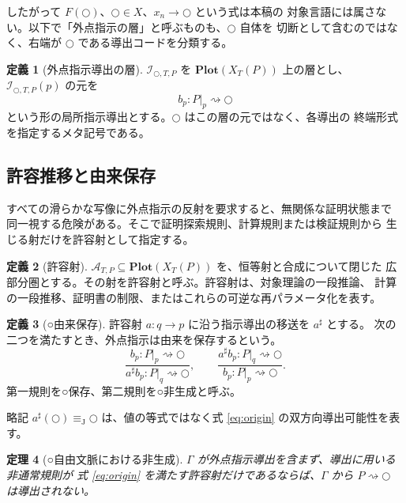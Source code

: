 \documentclass[a4paper,11pt]{ltjsarticle}
\theoremstyle{definition}
\newtheorem{definition}{定義}[section]
\theoremstyle{plain}
\newtheorem{theorem}[definition]{定理}
\newcommand{\dfix}{\mathord{\text{○}}}
\newcommand{\Plot}{\mathbf{Plot}}
\newcommand{\JTeq}{\equiv_{\mathrm J}}
\newcommand{\1}{\mathbf{1}}
\begin{document}
したがって $F(\dfix)$、$\dfix\in X$、$x_n\to\dfix$ という式は本稿の
対象言語には属さない。以下で「外点指示の層」と呼ぶものも、$\dfix$ 自体を
切断として含むのではなく、右端が $\dfix$ である導出コードを分類する。

\begin{definition}[外点指示導出の層]
$\mathcal I_{\dfix,T,P}$ を $\Plot(X_T(P))$ 上の層とし、
$\mathcal I_{\dfix,T,P}(p)$ の元を
\[
 b_p:P|_p\rightsquigarrow\dfix
\]
という形の局所指示導出とする。$\dfix$ はこの層の元ではなく、各導出の
終端形式を指定するメタ記号である。
\end{definition}

\subsection{許容推移と由来保存}

すべての滑らかな写像に外点指示の反射を要求すると、無関係な証明状態まで
同一視する危険がある。そこで証明探索規則、計算規則または検証規則から
生じる射だけを許容射として指定する。

\begin{definition}[許容射]
$\mathcal A_{T,P}\subseteq\Plot(X_T(P))$ を、恒等射と合成について閉じた
広部分圏とする。その射を許容射と呼ぶ。許容射は、対象理論の一段推論、
計算の一段推移、証明書の制限、またはこれらの可逆な再パラメータ化を表す。
\end{definition}

\begin{definition}[○由来保存]
許容射 $a:q\to p$ に沿う指示導出の移送を $a^\sharp$ とする。
次の二つを満たすとき、外点指示は由来を保存するという。
\begin{equation}\label{eq:origin}
 \frac{b_p:P|_p\rightsquigarrow\dfix}
      {a^\sharp b_p:P|_q\rightsquigarrow\dfix},
 \qquad
 \frac{a^\sharp b_p:P|_q\rightsquigarrow\dfix}
      {b_p:P|_p\rightsquigarrow\dfix}.
\end{equation}
第一規則を○保存、第二規則を○非生成と呼ぶ。
\end{definition}

略記 $a^\sharp(\dfix)\JTeq\dfix$ は、値の等式ではなく式
\eqref{eq:origin} の双方向導出可能性を表す。

\begin{theorem}[○自由文脈における非生成]\label{thm:no-origin}
$\Gamma$ が外点指示導出を含まず、導出に用いる非通常規則が
式 \eqref{eq:origin} を満たす許容射だけであるならば、$\Gamma$ から
$P\rightsquigarrow\dfix$ は導出されない。
\end{theorem}
\end{document}
